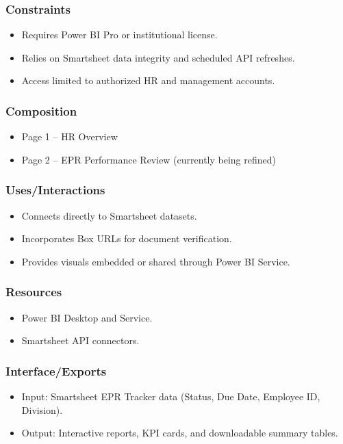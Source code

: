 \documentclass[12pt]{article}
\def\textbf#1{#1}%
\begin{document}
\subsubsection{Constraints}
\begin{itemize}[nosep]
  \item Requires Power BI Pro or institutional license.
  \item Relies on Smartsheet data integrity and scheduled API refreshes.
  \item Access limited to authorized HR and management accounts.
\end{itemize}

\subsubsection{Composition}
\begin{itemize}[nosep]
  \item Page 1 – HR Overview
  \item Page 2 – EPR Performance Review (currently being refined)
\end{itemize}

\subsubsection{Uses/Interactions}
\begin{itemize}[nosep]
  \item Connects directly to Smartsheet datasets.
  \item Incorporates Box URLs for document verification.
  \item Provides visuals embedded or shared through Power BI Service.
\end{itemize}

\subsubsection{Resources}
\begin{itemize}[nosep]
  \item Power BI Desktop and Service.
  \item Smartsheet API connectors.
\end{itemize}

\subsubsection{Interface/Exports}
\begin{itemize}[nosep]
  \item \textbf{Input:} Smartsheet EPR Tracker data (Status, Due Date, Employee ID, Division).
  \item \textbf{Output:} Interactive reports, KPI cards, and downloadable summary tables.
\end{itemize}
\end{document}

